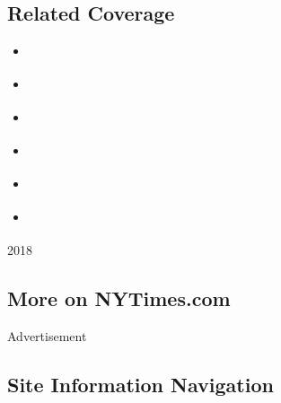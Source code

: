 \hypertarget{related-coverage}{%
\subsection{Related Coverage}\label{related-coverage}}

\begin{itemize}
\tightlist
\item
  \href{https://www.nytimes3xbfgragh.onion/interactive/2018/10/03/magazine/lady-gaga-movie-star-is-born.html}{}
\item
  \href{https://www.nytimes3xbfgragh.onion/interactive/2018/10/03/magazine/morality-social-justice-art-entertainment.html}{}
\item
  \href{https://www.nytimes3xbfgragh.onion/interactive/2018/10/04/magazine/good-place-michael-schur-philosophy.html}{}
\item
  \href{https://www.nytimes3xbfgragh.onion/interactive/2018/10/04/magazine/barry-jenkins-james-baldwin-if-beale-street-could-talk.html}{}
\item
  \href{https://www.nytimes3xbfgragh.onion/interactive/2018/10/05/magazine/instagram-cindy-sherman-ugly-beauty.html}{}
\item
  \href{https://www.nytimes3xbfgragh.onion/interactive/2018/10/05/magazine/culture-moments-2018.html}{}
\end{itemize}

2018

\hypertarget{more-on-nytimescom}{%
\subsection{More on NYTimes.com}\label{more-on-nytimescom}}

Advertisement

\hypertarget{site-information-navigation}{%
\subsection{Site Information
Navigation}\label{site-information-navigation}}

